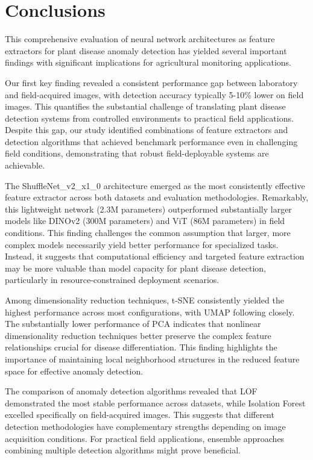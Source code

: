 \documentclass[12pt,a4paper,oneside]{report}
\begin{document}
\section{Conclusions}

This comprehensive evaluation of neural network architectures as feature extractors for plant disease anomaly detection has yielded several important findings with significant implications for agricultural monitoring applications.

Our first key finding revealed a consistent performance gap between laboratory and field-acquired images, with detection accuracy typically 5-10\% lower on field images. This quantifies the substantial challenge of translating plant disease detection systems from controlled environments to practical field applications. Despite this gap, our study identified combinations of feature extractors and detection algorithms that achieved benchmark performance even in challenging field conditions, demonstrating that robust field-deployable systems are achievable.

The ShuffleNet\_v2\_x1\_0 architecture emerged as the most consistently effective feature extractor across both datasets and evaluation methodologies. Remarkably, this lightweight network (2.3M parameters) outperformed substantially larger models like DINOv2 (300M parameters) and ViT (86M parameters) in field conditions. This finding challenges the common assumption that larger, more complex models necessarily yield better performance for specialized tasks. Instead, it suggests that computational efficiency and targeted feature extraction may be more valuable than model capacity for plant disease detection, particularly in resource-constrained deployment scenarios.

Among dimensionality reduction techniques, t-SNE consistently yielded the highest performance across most configurations, with UMAP following closely. The substantially lower performance of PCA indicates that nonlinear dimensionality reduction techniques better preserve the complex feature relationships crucial for disease differentiation. This finding highlights the importance of maintaining local neighborhood structures in the reduced feature space for effective anomaly detection.

The comparison of anomaly detection algorithms revealed that LOF demonstrated the most stable performance across datasets, while Isolation Forest excelled specifically on field-acquired images. This suggests that different detection methodologies have complementary strengths depending on image acquisition conditions. For practical field applications, ensemble approaches combining multiple detection algorithms might prove beneficial.
\end{document}
